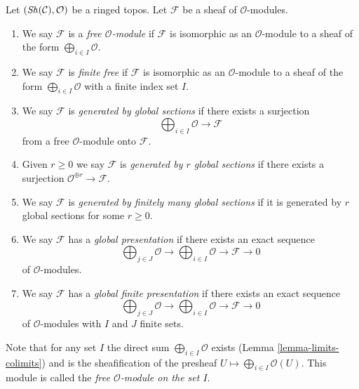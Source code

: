 \begin{definition}
\label{definition-global}
Let $(\mathop{\mathit{Sh}}\nolimits(\mathcal{C}), \mathcal{O})$ be a ringed topos.
Let $\mathcal{F}$ be a sheaf of $\mathcal{O}$-modules.
\begin{enumerate}
\item We say $\mathcal{F}$ is a {\it free $\mathcal{O}$-module}
if $\mathcal{F}$ is isomorphic as an $\mathcal{O}$-module
to a sheaf of the form $\bigoplus_{i \in I} \mathcal{O}$.
\item We say $\mathcal{F}$ is {\it finite free} if
$\mathcal{F}$ is isomorphic as an $\mathcal{O}$-module
to a sheaf of the form $\bigoplus_{i \in I} \mathcal{O}$
with a finite index set $I$.
\item We say $\mathcal{F}$ is {\it generated by global sections}
if there exists a surjection
$$
\bigoplus\nolimits_{i \in I} \mathcal{O} \longrightarrow \mathcal{F}
$$
from a free $\mathcal{O}$-module onto $\mathcal{F}$.
\item Given $r \geq 0$ we say $\mathcal{F}$ is
{\it generated by $r$ global sections} if there exists a surjection
$\mathcal{O}^{\oplus r} \to \mathcal{F}$.
\item We say $\mathcal{F}$ is {\it generated by finitely many global sections}
if it is generated by $r$ global sections for some $r \geq 0$.
\item We say $\mathcal{F}$ has a {\it global presentation}
if there exists an exact sequence
$$
\bigoplus\nolimits_{j \in J} \mathcal{O} \longrightarrow
\bigoplus\nolimits_{i \in I} \mathcal{O} \longrightarrow
\mathcal{F} \longrightarrow 0
$$
of $\mathcal{O}$-modules.
\item We say $\mathcal{F}$ has a {\it global finite presentation}
if there exists an exact sequence
$$
\bigoplus\nolimits_{j \in J} \mathcal{O} \longrightarrow
\bigoplus\nolimits_{i \in I} \mathcal{O} \longrightarrow
\mathcal{F} \longrightarrow 0
$$
of $\mathcal{O}$-modules with $I$ and $J$ finite sets.
\end{enumerate}
\end{definition}

\noindent
Note that for any set $I$ the direct sum
$\bigoplus_{i \in I} \mathcal{O}$ exists
(Lemma \ref{lemma-limits-colimits})
and is the sheafification of the presheaf
$U \mapsto \bigoplus_{i \in I} \mathcal{O}(U)$.
This module is called the {\it free $\mathcal{O}$-module on the set $I$}.

